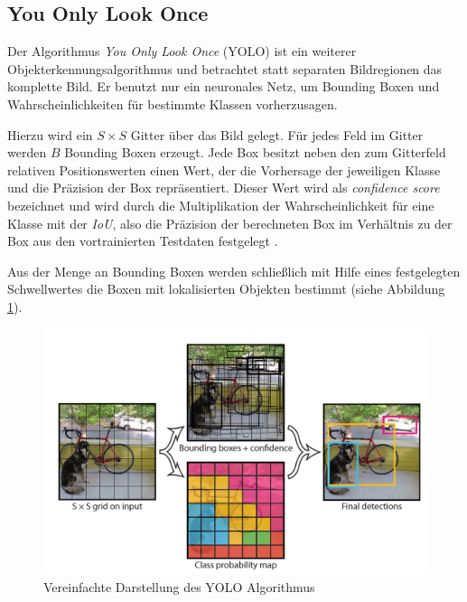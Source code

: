 \subsection*{You Only Look Once}

Der Algorithmus \textit{You Only Look Once} (YOLO) ist ein weiterer Objekterkennungsalgorithmus und betrachtet statt separaten Bildregionen das komplette Bild. Er benutzt nur ein neuronales Netz, um Bounding Boxen und Wahrscheinlichkeiten für bestimmte Klassen vorherzusagen.

Hierzu wird ein $S \times S$ Gitter über das Bild gelegt. Für jedes Feld im Gitter werden $B$ Bounding Boxen erzeugt. Jede Box besitzt neben den zum Gitterfeld relativen Positionswerten einen Wert, der die Vorhersage der jeweiligen Klasse und die Präzision der Box repräsentiert. Dieser Wert wird als \textit{confidence score} bezeichnet und wird durch die Multiplikation der Wahrscheinlichkeit für eine Klasse mit der \textit{IoU}, also die Präzision der berechneten Box im Verhältnis zu der Box aus den vortrainierten Testdaten festgelegt \cite{JosephRedmon.2016}.

Aus der Menge an Bounding Boxen werden schließlich mit Hilfe eines festgelegten Schwellwertes die Boxen mit lokalisierten Objekten bestimmt (siehe Abbildung \ref{yolo_model}).

\begin{figure}[ht]
	\begin{center}
		\includegraphics[width=15cm]{Bilder/yolo_model.png} 
		\caption[Vereinfachte Darstellung des YOLO Algorithmus]{Vereinfachte Darstellung des YOLO Algorithmus \cite{JosephRedmon.2016}}
		\label{yolo_model}
	\end{center}
\end{figure}

